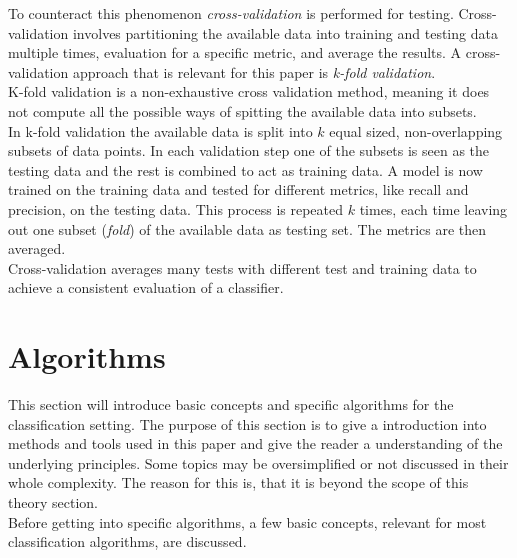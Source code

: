 To counteract this phenomenon \emph{cross-validation} is performed for testing. Cross-validation involves partitioning the available data into training and testing data multiple times, evaluation for a specific metric, and average the results. A cross-validation approach that is relevant for this paper is \emph{k-fold validation}.
\\ 

K-fold validation is a non-exhaustive cross validation method, meaning it does not compute all the possible ways of spitting the available data into subsets. \\
In k-fold validation the available data is split into $k$ equal sized, non-overlapping subsets of data points. In each validation step one of the subsets is seen as the testing data and the rest is combined to act as training data. A model is now trained on the training data and tested for different metrics, like recall and precision, on the testing data. This process is repeated $k$ times, each time leaving out one subset (\emph{fold}) of the available data as testing set. The metrics are then averaged.
\\

Cross-validation averages many tests with different test and training data to achieve a consistent evaluation of a classifier. \cite{RonKohavi.1995} \cite{kfold}

\section{Algorithms}
This section will introduce basic concepts and specific algorithms for the classification setting. The purpose of this section is to give a introduction into methods and tools used in this paper and give the reader a understanding of the underlying principles. Some topics may be oversimplified or not discussed in their whole complexity. The reason for this is, that it is beyond the scope of this theory section.
\\

Before getting into specific algorithms, a few basic concepts, relevant for most classification algorithms, are discussed.
\\

